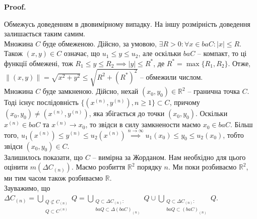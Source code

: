 \documentclass[a4paper, 10pt]{article}
\makeatletter
\def\qed{$\blacksquare$}
\theoremstyle{theoremdd}
\theoremstyle{theoremdd}
\theoremstyle{theoremdd}
\theoremstyle{theoremdd}
\theoremstyle{theoremdd}
\theoremstyle{theoremdd}
\theoremstyle{theoremdd}
\theoremstyle{theoremdd}
\renewenvironment{proof}[1][Proof.\\]{\par
\pushQED{\hfill \qed}%
\normalfont \topsep6\p@\@plus6\p@\relax
\trivlist
\item\relax
{\bfseries
#1\@addpunct{.}}\hspace\labelsep\ignorespaces
}{%
\popQED\endtrivlist\@endpefalse
}
\makeatother
\begin{document}
\begin{proof}
Обмежусь доведенням в двовимірному випадку. На іншу розмірність доведення залишається таким самим.\\
Множина $C$ буде обмеженою. Дійсно, за умовою, $\exists R > 0: \forall x \in baC: |x| \leq R$. Також $(x,y) \in C$ означає, що $u_1 \leq y \leq u_2$, але оскільки $baC$ -- компакт, то ці функції обмежені, тож $R_1 \leq y \leq R_2 \implies |y| \leq R^*$, де $R^* = \max\{R_1,R_2\}$. Отже, $\|(x,y)\| = \sqrt{x^2+y^2} \leq \sqrt{R^2 + (R^*)^2}$ -- обмежили числом.
\bigskip \\
Множина $C$ буде замкненою. Дійсно, нехай $(x_0,y_0) \in \mathbb{R}^2$ -- гранична точка $C$. Тоді існує послідовність $\{(x^{(n)},y^{(n)}), n \geq 1\} \subset C$, причому $(x_0,y_0) \neq (x^{(n)},y^{(n)})$, яка збігається до точки $(x_0,y_0)$. Оскільки $x^{(n)} \in baC$ та $x^{(n)} \to x_0$, то звідси в силу замкнености маємо $x_0 \in baC$. Більш того, $u_1(x^{(n)}) \leq y^{(n)} \leq u_2(x^{(n)}) \overset{n \to \infty}{\implies} u_1(x_0) \leq y_0 \leq u_2(x_0)$, тобто звідси $(x_0,y_0) \in C$.
\bigskip \\
Залишилось показати, що $C$ -- вимірна за Жорданом. Нам необхідно для цього оцінити $m(\Delta C_{(n)})$. Маємо розбиття $\mathbb{R}^2$ порядку $n$. Ми поки розбиваємо $\mathbb{R}^2$, ми тим часом також розбиваємо $\mathbb{R}$.\\
Зауважимо, що\\
$\Delta C_{(n)} = \displaystyle\bigcup_{\substack{Q \not\subset C_{(n)} \\ Q \subset C^{(n)}}} Q = \bigcup_{\substack{Q \subset \Delta C_{(n)}: \\ baQ \subset \Delta (baC)_{(n)} }} Q \cup \bigcup_{\substack{Q \subset \Delta C_{(n)}: \\ baQ \subset (baC)_{(n)} }} Q$.
\begin{figure}[H]
\centering
{}
\end{figure}
\end{proof}
\end{document}
